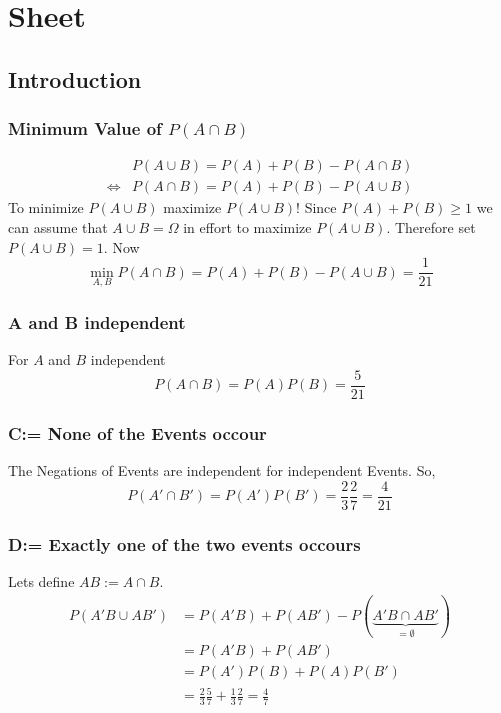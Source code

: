 \section{Sheet}
\subsection{Introduction}
\subsubsection{Minimum Value of $P\left(A\cap B\right)$}
\begin{align}
    &P\left(A\cup B\right)=P\left(A\right)+P\left(B\right)-P\left(A\cap B\right)
    \\\Leftrightarrow &P\left(A\cap B\right)=P\left(A\right)+P\left(B\right)-P\left(A\cup B\right)
\end{align}
To minimize $P\left(A\cup B\right)$ maximize $P\left(A\cup B\right)$!
Since $P\left(A\right)+P\left(B\right)\geq1$ we can assume that ${A\cup B = \Omega}$ in effort to maximize
$P\left(A\cup B\right)$. Therefore set $P\left(A\cup B\right) = 1$. Now
\begin{equation}
    \min_{A,B}P\left(A\cap B\right)=P\left(A\right)+P\left(B\right)-P\left(A\cup B\right)=\frac{1}{21}
\end{equation}
\subsubsection{A and B independent}
For $A$ and $B$ independent
\begin{equation}
    P\left(A\cap B\right)=P\left(A\right)P\left(B\right)=\frac{5}{21}
\end{equation}
\subsubsection{C:= None of the Events occour}
The Negations of Events are independent for independent Events. So,
\begin{equation}
    P\left(A'\cap B'\right)=P\left(A'\right)P\left(B'\right)=\frac{2}{3}\frac{2}{7}=\frac{4}{21}
\end{equation}
\subsubsection{D:= Exactly one of the two events occours}
Lets define $AB:=A\cap B$.
\begin{align}
    P\left(A'B\cup AB'\right)&=P\left(A'B\right)+P\left(AB'\right)-P\left(\underbrace{A'B\cap AB'}_{=\emptyset}\right)\label{disjointIntersection}
    \\&=P\left(A'B\right)+P\left(AB'\right)
    \\&=P\left(A'\right)P\left(B\right)+P\left(A\right)P\left(B'\right)
    \\&=\frac{2}{3}\frac{5}{7}+\frac{1}{3}\frac{2}{7}=\frac{4}{7}
\end{align}

